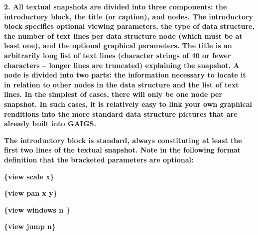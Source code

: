 \documentclass[12pt]{article}
\begin{document}
\begin{flushleft}
\textbf{{\footnotesize{}2.      All textual snapshots are divided into three components: the introductory block, the title (or caption), and nodes.  The introductory block specifies optional viewing parameters, the type of data structure, the number of text lines per data structure node (which must be at least one), and the optional graphical parameters.  The title is an arbitrarily long list of text lines (character strings of 40 or fewer characters -- longer lines are truncated) explaining the snapshot.  A node is divided into two parts: the information necessary to locate it in relation to other nodes in the data structure  and  the list of text lines.  In the simplest of cases, there will only be one node per snapshot.  In such cases, it is relatively easy to link your own graphical renditions into the more standard data structure pictures that are already built into GAIGS.}}
\end{flushleft}

\begin{flushleft}

\end{flushleft}

\begin{flushleft}
\textbf{{\footnotesize{}The introductory block is standard, always constituting at least the first two lines of the textual snapshot.  Note in the following format definition that the bracketed parameters are optional:}}
\end{flushleft}

\begin{flushleft}

\end{flushleft}

\begin{flushleft}
\textbf{{\footnotesize{}\{view scale x\}}}
\end{flushleft}

\begin{flushleft}
\textbf{{\footnotesize{}\{view pan x y\}}}
\end{flushleft}

\begin{flushleft}
\textbf{{\footnotesize{}\{view windows n \}}}
\end{flushleft}

\begin{flushleft}
\textbf{{\footnotesize{}\{view jump n\}}}
\end{flushleft}
\end{document}
